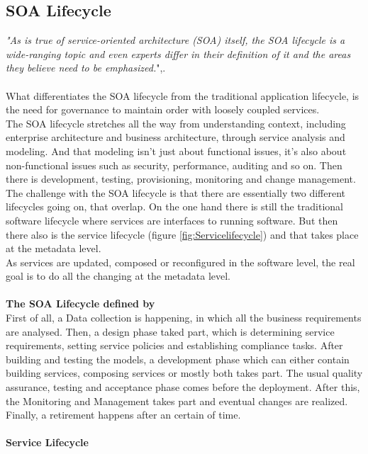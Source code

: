 \documentclass[12pt]{article}
\begin{document}
\subsection{SOA Lifecycle}
\textit{"As is true of service-oriented architecture (SOA) itself, the SOA lifecycle is a wide-ranging topic and even experts differ in their definition of it and the areas they believe need to be emphasized.}",\cite{soalycman}.\\\\
What differentiates the SOA lifecycle from the traditional application lifecycle, is the need for governance to maintain order with loosely coupled services.
\\
The SOA lifecycle stretches all the way from understanding context, including enterprise architecture and business architecture, through service analysis and modeling. And that modeling isn't just about functional issues, it's also about non-functional issues such as security, performance, auditing and so on. Then there is development, testing, provisioning, monitoring and change management. \\
The challenge with the SOA lifecycle is that there are essentially two different lifecycles going on, that overlap. On the one hand there is still the traditional software lifecycle where services are interfaces to running software. But then there also is the service lifecycle (figure \ref{fig:Servicelifecycle}) and that takes place at the metadata level.\\
As services are updated, composed or reconfigured in the software level, the real goal is to do all the changing at the metadata level.\cite{soalycman}\\
\\
\textbf{The SOA Lifecycle defined by \cite{soalycman}}\\
First of all, a Data collection is happening, in which all the business requirements are analysed. Then, a design phase taked part, which is determining service requirements, setting service policies and establishing compliance tasks. After building and testing the models, a development phase which can either contain building services, composing services or mostly both takes part. The usual quality assurance, testing and acceptance phase comes before the deployment. After this, the Monitoring and Management takes part and eventual changes are realized. Finally, a retirement happens after an certain of time.\\\\
\textbf{Service Lifecycle}\\
\end{document}
